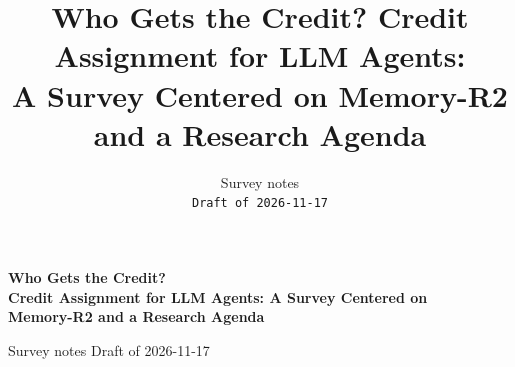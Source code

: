 \documentclass[10pt]{article}
\title{Who Gets the Credit? Credit Assignment for LLM Agents:\\
A Survey Centered on Memory-R2 and a Research Agenda}
\author{%
  Survey notes\\
  \texttt{Draft of 2026-11-17}
}
\begin{document}
\ifdefined\usingofficialstyle\else
\begin{center}
  {\LARGE\bfseries Who Gets the Credit?\\[3pt]
  {\Large Credit Assignment for LLM Agents: A Survey Centered on\\ Memory-R2 and a Research Agenda}\par}
  \vspace{1em}
  {\normalsize Survey notes \quad\textperiodcentered\quad Draft of 2026-11-17\par}
  \vspace{1.5em}
\end{center}
\fi
\ifdefined\usingofficialstyle\maketitle\fi















\appendix

\end{document}
